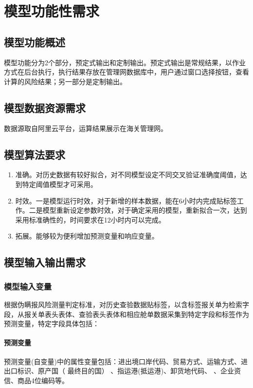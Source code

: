 \documentclass[a4paper]{tufte-book}%
\theoremstyle{definition}
\theoremstyle{definition}
\begin{document}
\chapter{模型功能性需求}
\section{模型功能概述}
模型功能分为2个部分，预定式输出和定制输出。预定式输出是常规结果，以作业方式在后台执行，执行结果存放在管理网数据库中，用户通过窗口选择按钮，查看计算的风险结果；另一部分是定制输出。
\section{模型数据资源需求}
数据源取自阿里云平台，运算结果展示在海关管理网。

\section{模型算法要求}\label{sec:algorithm of model}


\begin{enumerate}[label=(\roman*)]
	\item 准确。对历史数据有较好拟合，对不同模型设定不同交叉验证准确度阈值，达到特定阈值模型才可采用。
	\item 时效。一是模型运行时效，对于新增的样本数据，能在6小时内完成贴标签工作。二是模型重新设定参数时效，对于确定采用的模型，重新拟合一次，达到采用标准确性的，时间要求在12小时内可以完成。
	\item 拓展。能够较为便利增加预测变量和响应变量。
\end{enumerate}

\section{模型输入输出需求}
\subsection{模型输入变量}
根据伪瞒报风险测量判定标准，对历史查验数据贴标签，以含标签报关单为检索字段，从报关单表头表体、查验表头表体和相应舱单数据采集到特定字段和标签作为预测变量，特定字段具体包括：
\subsubsection{预测变量}
预测变量(自变量)中的属性变量包括：进出境口岸代码、贸易方式、运输方式、进出口标识、原产国（
最终目的国）
、指运港(抵运港)、卸货地代码、
、企业资信、商品4位编码等。
\end{document}
